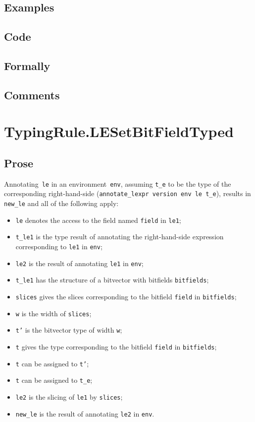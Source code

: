 \documentclass{book}
\begin{document}
  \subsection{Examples}

  \subsection{Code}

  \subsection{Formally}

  \subsection{Comments}

\section{TypingRule.LESetBitFieldTyped \label{sec:TypingRule.LESetBitFieldTyped}}

    \subsection{Prose}
   Annotating~\texttt{le} in an environment~\texttt{env}, assuming
\texttt{t\_e} to be the type of the corresponding right-hand-side
(\texttt{annotate\_lexpr version env le t\_e}), results in \texttt{new\_le} and
all of the following apply:
   \begin{itemize}
   \item \texttt{le} denotes the access to the field named \texttt{field} in \texttt{le1};
   \item \texttt{t\_le1} is the type result of annotating the right-hand-side expression corresponding to \texttt{le1} in \texttt{env};
   \item \texttt{le2} is the result of annotating \texttt{le1} in \texttt{env};
   \item \texttt{t\_le1} has the structure of a bitvector with bitfields \texttt{bitfields};
   \item \texttt{slices} gives the slices corresponding to the bitfield \texttt{field} in
      \texttt{bitfields};
   \item \texttt{w} is the width of \texttt{slices};
   \item \texttt{t'} is the bitvector type of width \texttt{w};
   \item \texttt{t} gives the type corresponding to the bitfield \texttt{field} in
      \texttt{bitfields};
   \item \texttt{t} can be assigned to \texttt{t'};
   \item \texttt{t} can be assigned to \texttt{t\_e};
   \item \texttt{le2} is the slicing of \texttt{le1} by \texttt{slices};
   \item \texttt{new\_le} is the result of annotating \texttt{le2} in \texttt{env}.
   \end{itemize}
\end{document}
